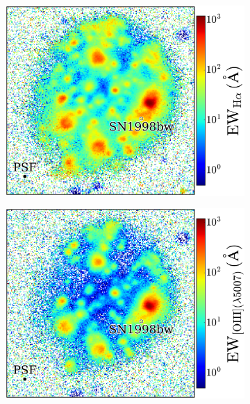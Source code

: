 \documentclass[traditabstract]{aa}
\begin{document}
\begin{figure}
\begin{subfigure}{.2425\textwidth}
  \includegraphics[width=1.0\linewidth]{Figs/MUSE_SN1998bw_HaEW.pdf}
\end{subfigure}
\begin{subfigure}{.2425\textwidth}
  \includegraphics[width=1.0\linewidth]{Figs/MUSE_SN1998bw_OIIIEW.pdf}
\end{subfigure}
\begin{subfigure}{.2425\textwidth}

\end{subfigure}
\end{figure}
\end{document}
